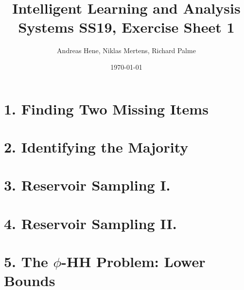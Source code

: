 \documentclass{article}
\begin{document}
\title{Intelligent Learning and Analysis Systems SS19, Exercise Sheet 1}
\author{Andreas Hene, Niklas Mertens, Richard Palme}
\date{\today}
\maketitle

\section*{1. Finding Two Missing Items}



\section*{2. Identifying the Majority}



\section*{3. Reservoir Sampling I.}



\section*{4. Reservoir Sampling II.}



\section*{5. The $\phi$-HH Problem: Lower Bounds}
\end{document}
